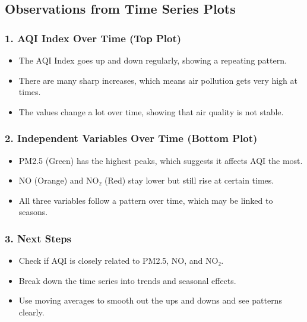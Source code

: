 \documentclass[11pt]{article}
\providecommand{\tightlist}{%
      \setlength{\itemsep}{0pt}\setlength{\parskip}{0pt}}
\begin{document}
    \hypertarget{observations-from-time-series-plots}{%
\subsection{Observations from Time Series
Plots}\label{observations-from-time-series-plots}}

\hypertarget{aqi-index-over-time-top-plot}{%
\subsubsection{1. AQI Index Over Time (Top
Plot)}\label{aqi-index-over-time-top-plot}}

\begin{itemize}
\tightlist
\item
  The AQI Index goes up and down regularly, showing a repeating pattern.
\item
  There are many sharp increases, which means air pollution gets very
  high at times.
\item
  The values change a lot over time, showing that air quality is not
  stable.
\end{itemize}

\hypertarget{independent-variables-over-time-bottom-plot}{%
\subsubsection{2. Independent Variables Over Time (Bottom
Plot)}\label{independent-variables-over-time-bottom-plot}}

\begin{itemize}
\tightlist
\item
  PM2.5 (Green) has the highest peaks, which suggests it affects AQI the
  most.
\item
  NO (Orange) and NO₂ (Red) stay lower but still rise at certain times.
\item
  All three variables follow a pattern over time, which may be linked to
  seasons.
\end{itemize}

\hypertarget{next-steps}{%
\subsubsection{3. Next Steps}\label{next-steps}}

\begin{itemize}
\tightlist
\item
  Check if AQI is closely related to PM2.5, NO, and NO₂.
\item
  Break down the time series into trends and seasonal effects.
\item
  Use moving averages to smooth out the ups and downs and see patterns
  clearly.
\end{itemize}
\end{document}
